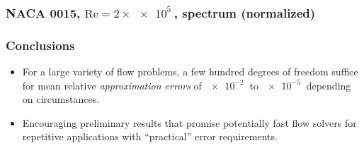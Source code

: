 \documentclass{beamer}
\begin{document}
\begin{frame}[fragile]
  \frametitle{NACA 0015, $\text{Re}=2\times\SI{e5}{}$, spectrum (normalized)}

  \begin{center}
  \end{center}
\end{frame}

\begin{frame}[fragile]
  \frametitle{Conclusions}

  \begin{itemize}
  \item For a large variety of flow problems, a few hundred degrees of freedom
    suffice for mean relative \emph{approximation errors} of $\SI{e-2}{}$ to
    $\SI{e-5}{}$ depending on circumstances.
  \item Encouraging preliminary results that promise potentially fast flow
    solvers for repetitive applications with ``practical'' error requirements.
  \end{itemize}
\end{frame}
\end{document}
